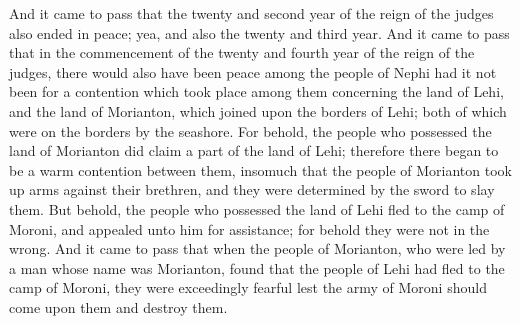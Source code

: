 \bverse \iffalse And it came to pass that the twenty and second year of the reign of the judges also ended in peace; yea, and also the twenty and third year. \fi
And it came to pass that the twenty and second year of the reign of the judges also ended in peace; yea, and also the twenty and third year.
\bverse \iffalse And it came to pass that in the commencement of the twenty and fourth year of the reign of the judges, there would also have been peace among the people of Nephi had it not been for a contention which took place among them concerning the land of Lehi, and the land of Morianton, which joined upon the borders of Lehi; both of which were on the borders by the seashore. \fi
And it came to pass that in the commencement of the twenty and fourth year of the reign of the judges, there would also have been peace among the people of Nephi had it not been for a contention which took place among them concerning the land of Lehi, and the land of Morianton, which joined upon the borders of Lehi; both of which were on the borders by the seashore.
\bverse \iffalse For behold, the people who possessed the land of Morianton did claim a part of the land of Lehi; therefore there began to be a warm contention between them, insomuch that the people of Morianton took up arms against their brethren, and they were determined by the sword to slay them. \fi
For behold, the people who possessed the land of Morianton did claim a part of the land of Lehi; therefore there began to be a warm contention between them, insomuch that the people of Morianton took up arms against their brethren, and they were determined by the sword to slay them.
\bverse \iffalse But behold, the people who possessed the land of Lehi fled to the camp of Moroni, and appealed unto him for assistance; for behold they were not in the wrong. \fi
But behold, the people who possessed the land of Lehi fled to the camp of Moroni, and appealed unto him for assistance; for behold they were not in the wrong.
\bverse \iffalse And it came to pass that when the people of Morianton, who were led by a man whose name was Morianton, found that the people of Lehi had fled to the camp of Moroni, they were exceedingly fearful lest the army of Moroni should come upon them and destroy them. \fi
And it came to pass that when the people of Morianton, who were led by a man whose name was Morianton, found that the people of Lehi had fled to the camp of Moroni, they were exceedingly fearful lest the army of Moroni should come upon them and destroy them.
